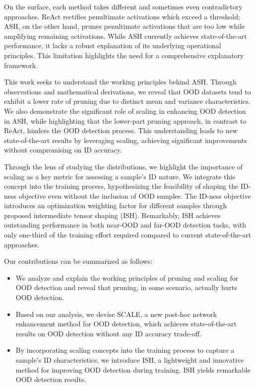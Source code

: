 \documentclass{article} %
\theoremstyle{plain}
\begin{document}
On the surface, each method takes different and sometimes even contradictory approaches.  
ReAct rectifies penultimate activations which exceed a threshold; ASH, on the other hand, prunes penultimate activations that are too low while amplifying remaining activations.
While ASH currently achieves state-of-the-art performance, it lacks a robust explanation of its underlying operational principles. This limitation highlights the need for a comprehensive explanatory framework.


This work seeks to understand the working principles behind ASH. Through observations and mathematical derivations, we reveal that OOD datasets tend to exhibit a lower rate of pruning due to distinct mean and variance characteristics. We also demonstrate the significant role of scaling in enhancing OOD detection in ASH, while highlighting that the lower-part pruning approach, in contrast to ReAct, hinders the OOD detection process.
This understanding leads to new state-of-the-art results by leveraging scaling, achieving significant improvements without compromising on ID accuracy. 

Through the lens of studying the distributions, we highlight the importance of scaling as a key metric for assessing a sample's ID nature. We integrate this concept into the training process, hypothesizing the feasibility of shaping the ID-ness objective even without the inclusion of OOD samples.
The ID-ness objective introduces an optimization weighting factor for different samples through proposed intermediate tensor shaping (ISH). Remarkably, ISH achieves outstanding performance in both near-OOD and far-OOD detection tasks, with only one-third of the training effort required compared to current state-of-the-art approaches.

Our contributions can be summarized as follows:
\begin{itemize}
    \item We analyze and explain the working principles of pruning and scaling for OOD detection and reveal that pruning, in some scenario, actually hurts OOD detection. 
    \item Based on our analysis, we devise SCALE, a new post-hoc network enhancement method for OOD detection, which achieves state-of-the-art results on OOD detection without any ID accuracy trade-off.
    \item By incorporating scaling concepts into the training process to capture a sample's ID characteristics, we introduce ISH, a lightweight and innovative method for improving OOD detection during training. ISH yields remarkable OOD detection results.
\end{itemize}
\end{document}
